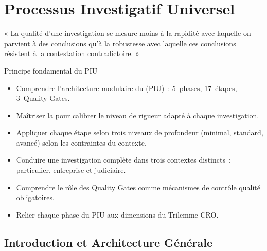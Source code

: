 
\chapter{Processus Investigatif Universel}
\label{chap:PIU}

\epigraph{%
    « La qualité d'une investigation se mesure moins à la rapidité avec
    laquelle on parvient à des conclusions qu'à la robustesse avec laquelle
    ces conclusions résistent à la contestation contradictoire. »%
}{Principe fondamental du PIU}


\begin{boxobjectifs}
\begin{itemize}
    \item Comprendre l'architecture modulaire du  (PIU)~: 5~phases, 17~étapes, 3~Quality Gates.
    \item Maîtriser la  pour calibrer le niveau
          de rigueur adapté à chaque investigation.
    \item Appliquer chaque étape selon trois niveaux de profondeur (minimal,
          standard, avancé) selon les contraintes du contexte.
    \item Conduire une investigation complète dans trois contextes distincts~:
          particulier, entreprise et judiciaire.
    \item Comprendre le rôle des Quality Gates comme mécanismes de contrôle
          qualité obligatoires.
    \item Relier chaque phase du PIU aux dimensions du Trilemme CRO.
\end{itemize}
\end{boxobjectifs}

\bigskip

\section{Introduction et Architecture Générale}
\label{sec:piu-intro}

